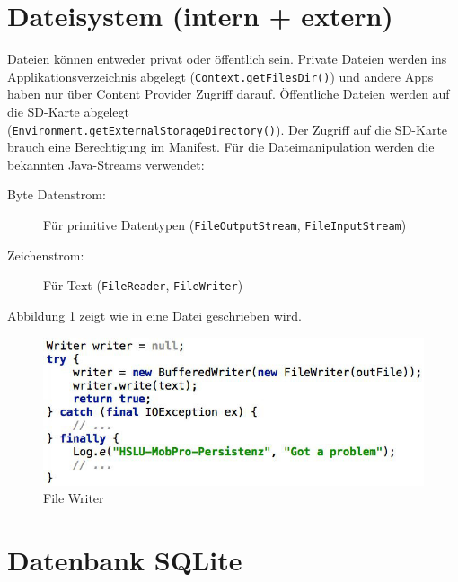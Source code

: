 \section{Dateisystem (intern + extern)}

Dateien können entweder privat oder öffentlich sein. Private Dateien werden ins Applikationsverzeichnis abgelegt (\texttt{Context.getFilesDir()}) und andere Apps haben nur über Content Provider Zugriff darauf. Öffentliche Dateien werden auf die SD-Karte abgelegt \\ (\texttt{Environment.getExternalStorageDirectory()}). Der Zugriff auf die SD-Karte brauch eine Berechtigung im Manifest.
Für die Dateimanipulation werden die bekannten Java-Streams verwendet:
\begin{description}
	\item[Byte Datenstrom:] Für primitive Datentypen (\texttt{FileOutputStream}, \texttt{FileInputStream})
	\item[Zeichenstrom:] Für Text (\texttt{FileReader}, \texttt{FileWriter})
\end{description}
Abbildung \ref{fig:file-writer} zeigt wie in eine Datei geschrieben wird.
\begin{figure}
\centering
\includegraphics[width=0.7\linewidth]{fig/file-writer}
\caption{File Writer}
\label{fig:file-writer}
\end{figure}

\section{Datenbank SQLite}

